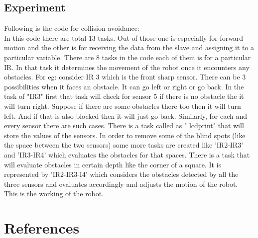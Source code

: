 \documentclass[11pt,a4paper]{book}
\begin{document}
	\subsection{Experiment}
	Following is the code for collision avoidance:\\
	
	\newpage
	In this code there are total 13 tasks. Out of those one is especially for forward motion and the other is for receiving the data from the slave and assigning it to a particular variable. There are 8 tasks in the code each of them is for a particular IR. In that task it determines the movement of the robot once it encounters any obstacles. For eg: consider IR 3 which is the front sharp sensor. There can be 3 possibilities when it faces an obstacle. It can go left or right or go back. In the task of "IR3" first that task will check for sensor 5 if there is no obstacle the it will turn right. Suppose if there are some obstacles there too then it will turn left. And if that is also blocked then it will just go back. Similarly, for each and every sensor there are such cases. There is a task called as " lcdprint" that will store the values of the sensors. In order to remove some of the blind spots (like the space between the two sensors) some more tasks are created like 'IR2-IR3' and 'IR3-IR4' which evaluates the obstacles for that spaces. There is a task that will evaluate obstacles in certain depth like the corner of a square. It is represented by 'IR2-IR3-I4' which considers the obstacles detected by all the three sensors and evaluates accordingly and adjusts the motion of the robot.\\
	This is the working of the robot.
	
\newpage

	\section{References}
	
	
\end{document}
